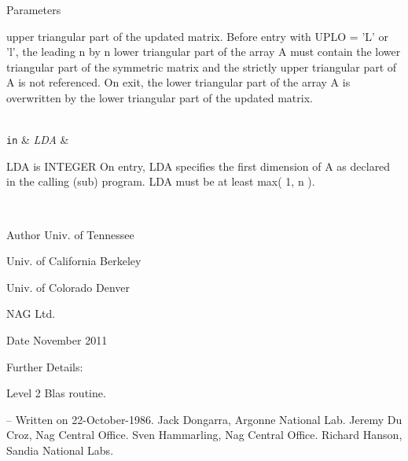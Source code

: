 \begin{DoxyParams}[1]{Parameters}
\begin{DoxyVerb}
           upper triangular part of the updated matrix.
           Before entry with UPLO = 'L' or 'l', the leading n by n
           lower triangular part of the array A must contain the lower
           triangular part of the symmetric matrix and the strictly
           upper triangular part of A is not referenced. On exit, the
           lower triangular part of the array A is overwritten by the
           lower triangular part of the updated matrix.\end{DoxyVerb}
\\
\hline
\mbox{\tt in}  & {\em L\+D\+A} & \begin{DoxyVerb}          LDA is INTEGER
           On entry, LDA specifies the first dimension of A as declared
           in the calling (sub) program. LDA must be at least
           max( 1, n ).\end{DoxyVerb}
 \\
\hline
\end{DoxyParams}
\begin{DoxyAuthor}{Author}
Univ. of Tennessee 

Univ. of California Berkeley 

Univ. of Colorado Denver 

N\+A\+G Ltd. 
\end{DoxyAuthor}
\begin{DoxyDate}{Date}
November 2011 
\end{DoxyDate}
\begin{DoxyParagraph}{Further Details\+: }
\begin{DoxyVerb}  Level 2 Blas routine.

  -- Written on 22-October-1986.
     Jack Dongarra, Argonne National Lab.
     Jeremy Du Croz, Nag Central Office.
     Sven Hammarling, Nag Central Office.
     Richard Hanson, Sandia National Labs.\end{DoxyVerb}
 
\end{DoxyParagraph}
\hypertarget{group__double__blas__level2_gae96880c53b8eaee70bbef273b905715f}{}
